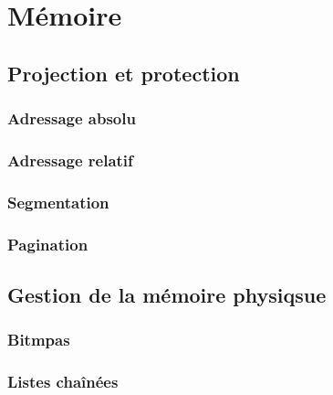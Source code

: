 \section{Mémoire}\label{sec:memoire}

\subsection{Projection et protection}
\subsubsection{Adressage absolu}
\subsubsection{Adressage relatif}
\subsubsection{Segmentation}
\subsubsection{Pagination}

\subsection{Gestion de la mémoire physiqsue}
\subsubsection{Bitmpas}
\subsubsection{Listes chaînées}
